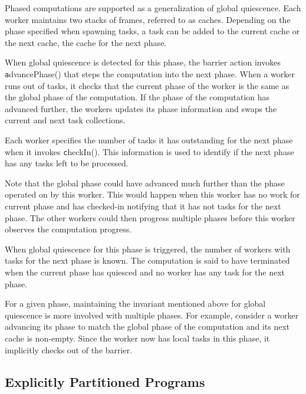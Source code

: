 Phased computations are supported as a generalization of global
quiescence. Each worker maintains two stacks of frames, referred to as
caches. Depending on the phase specified when spawning tasks, a task
can be added to the current cache or the next cache, the cache for the
next phase. 

When global quiescence is detected for this phase, the barrier action
invokes {\texttt advancePhase()} that steps the computation into the
next phase. When a worker runs out of tasks, it checks that the
current phase of the worker is the same as the global phase of the
computation. If the phase of the computation has advanced further, the
workers updates its phase information and swaps the current and next
task collections. 

Each worker specifies the number of tasks it has
outstanding for the next phase when it invokes {\texttt
  checkIn()}. This information is used to identify if the next phase
has any tasks left to be processed. 

Note that the global phase could have advanced much further than the
phase operated on by this worker. This would happen when this worker
has no work for current phase and has checked-in notifying that it has
not tasks for the next phase. The other workers could then progress
multiple phases before this worker observes the computation progress. 

When global quiescence for this phase is triggered, the number of
workers with tasks for the next phase is known. The computation is
said to have terminated when the current phase has quiesced and no
worker has any task for the next phase. 

For a given phase, maintaining the invariant mentioned above for
global quiescence is more involved with multiple phases. For example,
consider a worker advancing its phase to match the global phase of the
computation and its next cache is non-empty. Since the worker now has
local tasks in this phase, it implicitly checks out of the barrier.


\subsection{Explicitly Partitioned Programs}

